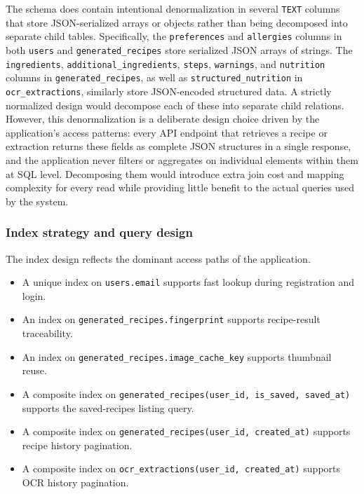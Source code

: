 The schema does contain intentional denormalization in several
\texttt{TEXT} columns that store JSON-serialized arrays or objects
rather than being decomposed into separate child tables.
Specifically, the \texttt{preferences} and \texttt{allergies}
columns in both \texttt{users} and \texttt{generated\_recipes} store
serialized JSON arrays of strings. The \texttt{ingredients},
\texttt{additional\_ingredients}, \texttt{steps}, \texttt{warnings},
and \texttt{nutrition} columns in \texttt{generated\_recipes}, as
well as \texttt{structured\_nutrition} in
\texttt{ocr\_extractions}, similarly store JSON-encoded structured
data. A strictly normalized design would decompose each of these
into separate child relations. However, this denormalization is a
deliberate design choice driven by the application's access patterns:
every API endpoint that retrieves a recipe or extraction returns
these fields as complete JSON structures in a single response, and
the application never filters or aggregates on individual elements
within them at SQL level. Decomposing them would introduce extra join
cost and mapping complexity for every read while providing little
benefit to the actual queries used by the system.

\subsubsection{Index strategy and query design}

The index design reflects the dominant access paths of the application.

\begin{itemize}
	\item A unique index on \texttt{users.email} supports fast lookup
	during registration and login.
	\item An index on \texttt{generated\_recipes.fingerprint} supports
	recipe-result traceability.
	\item An index on \texttt{generated\_recipes.image\_cache\_key}
	supports thumbnail reuse.
	\item A composite index on
	\texttt{generated\_recipes(user\_id, is\_saved, saved\_at)} supports
	the saved-recipes listing query.
	\item A composite index on
	\texttt{generated\_recipes(user\_id, created\_at)} supports recipe
	history pagination.
	\item A composite index on
	\texttt{ocr\_extractions(user\_id, created\_at)} supports OCR history
	pagination.
\end{itemize}

